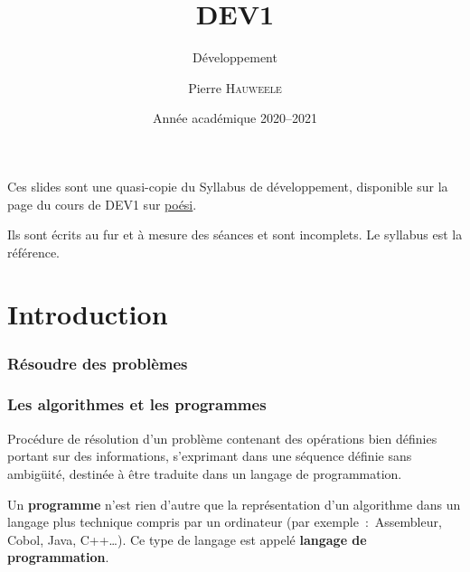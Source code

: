 
\hypersetup{colorlinks=false}

\title[DEV1-dev]{DEV1}
\subtitle{Développement}
\author[P. Hauweele (PHA)]{Pierre \textsc{Hauweele}}
\date[2020--2021]{Année académique 2020--2021}


\begin{frame}[plain]
  \titlepage
\end{frame}

\begin{frame}
  Ces slides sont une quasi-copie du Syllabus de développement, disponible sur
  la page du cours de DEV1 sur \href{https://poesi.esi-bru.be}{poési}.

  Ils sont écrits au fur et à mesure des séances et sont incomplets. Le
  syllabus est la référence.

\end{frame}
\begin{comment}
\end{comment}

\part{Introduction}
\frame{\partpage}
\section{Résoudre des problèmes}
\frame{\sectionpage}
\section{Les algorithmes et les programmes}
\frame{\sectionpage}
\begin{frame}
  \begin{definition}[Algorithme]
    Procédure de résolution d’un problème 
    contenant des opérations bien définies 
    portant sur des informations, 
    s’exprimant dans une séquence définie sans ambigüité, 
    destinée à être traduite dans un langage de programmation.
  \end{definition}
  \begin{definition}[Programme]
    Un \textbf{programme} n’est rien d’autre 
    que la représentation d’un algorithme 
    dans un langage plus technique compris par un ordinateur 
    (par exemple~:~Assembleur, Cobol, Java, C++\dots). 
    Ce type de langage est appelé 
    \textbf{langage de programmation}.
  \end{definition}
\end{frame}

